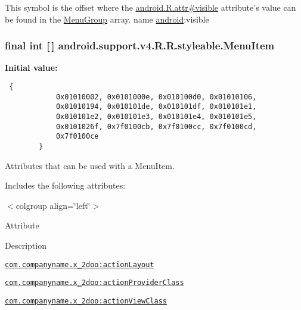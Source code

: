This symbol is the offset where the \hyperlink{}{android.R.attr\#visible} attribute's value can be found in the \hyperlink{classandroid_1_1support_1_1v4_1_1_r_1_1styleable_ba730c6d04433f7e2cb2ad1dd3b251a3}{MenuGroup} array.  name \hyperlink{namespaceandroid}{android}:visible \hypertarget{classandroid_1_1support_1_1v4_1_1_r_1_1styleable_05493a7eeaa2bff09c4fbacbfb671ccc}{
\subsubsection[{MenuItem}]{\setlength{\rightskip}{0pt plus 5cm}final int \mbox{[}$\,$\mbox{]} android.support.v4.R.R.styleable.MenuItem}}
\label{classandroid_1_1support_1_1v4_1_1_r_1_1styleable_05493a7eeaa2bff09c4fbacbfb671ccc}


\textbf{Initial value:}

\begin{Code}\begin{verbatim} {
            0x01010002, 0x0101000e, 0x010100d0, 0x01010106,
            0x01010194, 0x010101de, 0x010101df, 0x010101e1,
            0x010101e2, 0x010101e3, 0x010101e4, 0x010101e5,
            0x0101026f, 0x7f0100cb, 0x7f0100cc, 0x7f0100cd,
            0x7f0100ce
        }
\end{verbatim}
\end{Code}
Attributes that can be used with a MenuItem. 

Includes the following attributes: \begin{TabularC}{0}
\hline
\end{TabularC}
$<$colgroup align=\char`\"{}left\char`\"{}$>$ 

Attribute

Description 

{\tt \hyperlink{classandroid_1_1support_1_1v4_1_1_r_1_1styleable_a796f6f763b1b18c1f30a2dcfb9f5f72}{com.companyname.x\_\-2doo:actionLayout}}

{\tt \hyperlink{classandroid_1_1support_1_1v4_1_1_r_1_1styleable_4582e9564c219627c101073b05d99ca3}{com.companyname.x\_\-2doo:actionProviderClass}}

{\tt \hyperlink{classandroid_1_1support_1_1v4_1_1_r_1_1styleable_540db8eb18bf4f5b4d829924f23cf3ef}{com.companyname.x\_\-2doo:actionViewClass}}

